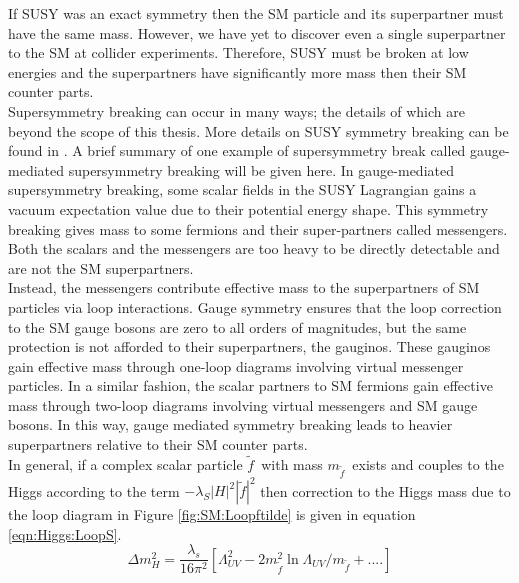 \indent If SUSY was an exact symmetry then the SM particle and its superpartner must have the same mass.  However, we have yet to discover even a single superpartner to the SM at collider experiments.  Therefore, SUSY must be broken at low energies and the superpartners have significantly more mass then their SM counter parts.  \\

\indent Supersymmetry breaking can occur in many ways; the details of which are beyond the scope of this thesis.  More details on SUSY symmetry breaking can be found in \cite{MartinSUSY}.  A brief summary of one example of supersymmetry break called gauge-mediated supersymmetry breaking will be given here.   In gauge-mediated supersymmetry breaking, some scalar fields in the SUSY Lagrangian gains a vacuum expectation value due to their potential energy shape.  This symmetry breaking gives mass to some fermions and their super-partners called messengers.  Both the scalars and the messengers are too heavy to be directly detectable and are not the SM superpartners.  \\

\indent Instead, the messengers contribute effective mass to the superpartners of SM particles via loop interactions.  Gauge symmetry ensures that the loop correction to the SM gauge bosons are zero to all orders of magnitudes, but the same protection is not afforded to their superpartners, the gauginos.  These gauginos gain effective mass through one-loop diagrams involving virtual messenger particles.  In a similar fashion, the scalar partners to SM fermions gain effective mass through two-loop diagrams involving virtual messengers and SM gauge bosons.  In this way, gauge mediated symmetry breaking leads to heavier superpartners relative to their SM counter parts.  \\


\indent In general, if a complex scalar particle $\tilde{f}$~with mass $m_{\tilde{f}}$~exists and couples to the Higgs according to the term $-\lambda_S|H|^2|\tilde{f}|^2$ then correction to the Higgs mass due to the loop diagram in Figure \ref{fig:SM:Loopftilde} is given in equation \ref{eqn:Higgs:LoopS}. \\

\begin{equation}
\label{eqn:Higgs:LoopS}
\Delta m_H^2 = \frac{\lambda_s}{16\pi^2}[\Lambda^2_{UV} - 2m_{\tilde{f}}^2 \ln{\Lambda_{UV}/m_{\tilde{f}}}+ ....]
\end{equation}

